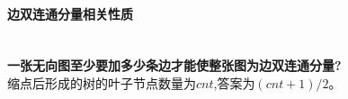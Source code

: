 \paragraph{边双连通分量相关性质}~{}
\\
\textbf{一张无向图至少要加多少条边才能使整张图为边双连通分量?}\\
缩点后形成的树的叶子节点数量为$cnt$,答案为$(cnt+1)/2$。\\

